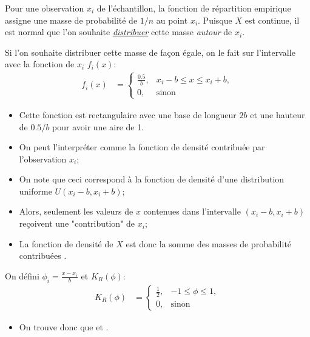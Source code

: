 \documentclass[10pt, french]{article}
\begin{document}
\begin{multicols*}{2}
Pour une observation $x_{i}$ de l'échantillon, la fonction de répartition empirique assigne une masse de probabilité de $1/n$ au point $x_{i}$.
Puisque $X$ est continue, il est normal que l'on souhaite \underline{\textit{distribuer}} cette masse \textit{autour} de $x_{i}$.

Si l'on souhaite distribuer cette masse de façon égale, on le fait sur l'intervalle \icbox{$[x_{i}  - b, x_{i} + b]$} avec la fonction de $x_{i}$ $f_{i}(x)$:
\begin{align*}
	f_{i}(x)
	&=	\begin{cases}
		\frac{0.5}{b},	&	x_{i} - b	\leq		x	\leq		x_{i} + b,	\\
		0,	&	\text{sinon}
		\end{cases}	
\end{align*}
\begin{itemize}[leftmargin = *]
	\item	Cette fonction est rectangulaire avec une base de longueur $2b$ et une hauteur de $0.5/b$ pour avoir une aire de 1.
	\item	On peut l'interpréter comme la fonction de densité contribuée par l'observation $x_{i}$;
	\item	On note que ceci correspond à la fonction de densité d'une distribution uniforme $U(x_{i} -  b, x_{i} + b)$;
	\item	Alors, seulement les valeurs de $x$ contenues dans l'intervalle $(x_{i} -  b, x_{i} + b)$ reçoivent une "contribution" de $x_{i}$;
	\item	La fonction de densité de $X$ est donc la somme des masses de probabilité contribuées .
\end{itemize}

On défini $\phi_{i}	=	\frac{x - x_{i}}{b}$ et $K_{R}(\phi)$:
\begin{align*}
	K_{R}(\phi)
	&=	\begin{cases}
		\frac{1}{2},	&	-1	\leq		\phi	\leq		1,	\\
		0,	&	\text{sinon}
		\end{cases}	
\end{align*}
\begin{itemize}[leftmargin = *]
	\item	On trouve donc que  et .
\end{itemize}


\end{multicols*}
\end{document}
